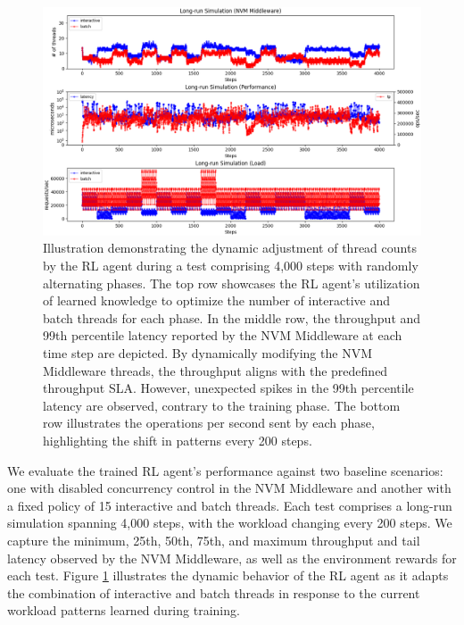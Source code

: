 \begin{figure}[ht]
  \centering
  \includegraphics[width=\textwidth,height=\textheight,keepaspectratio]{images/long_run_sim.png}
  \caption[Reinforcement Learning Agent Adaptation to Shifting Workloads]{Illustration demonstrating the dynamic adjustment of thread counts by the RL agent during a test comprising 4,000 steps with randomly alternating phases. The top row showcases the RL agent's utilization of learned knowledge to optimize the number of interactive and batch threads for each phase. In the middle row, the throughput and 99th percentile latency reported by the NVM Middleware at each time step are depicted. By dynamically modifying the NVM Middleware threads, the throughput aligns with the predefined throughput SLA. However, unexpected spikes in the 99th percentile latency are observed, contrary to the training phase. The bottom row illustrates the operations per second sent by each phase, highlighting the shift in patterns every 200 steps.}
  \label{fig:long_run_eval}
\end{figure}

We evaluate the trained RL agent's performance against two baseline scenarios: one with disabled concurrency control in the NVM Middleware and another with a fixed policy of 15 interactive and batch threads. Each test comprises a long-run simulation spanning 4,000 steps, with the workload changing every 200 steps. We capture the minimum, 25th, 50th, 75th, and maximum throughput and tail latency observed by the NVM Middleware, as well as the environment rewards for each test. Figure \ref{fig:long_run_eval} illustrates the dynamic behavior of the RL agent as it adapts the combination of interactive and batch threads in response to the current workload patterns learned during training.

